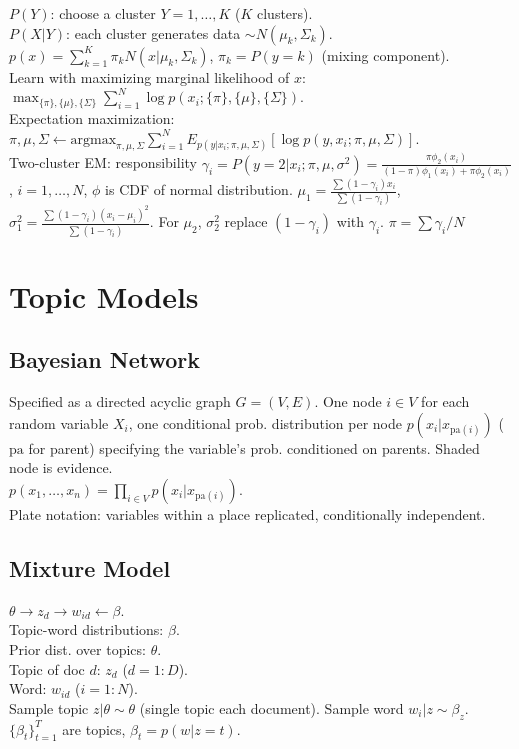 $P(Y)$: choose a cluster $Y=1, \dots, K$ ($K$ clusters).\\
$P(X|Y)$: each cluster generates data $\sim N(\mu_k, \Sigma_k)$.\\
$p(x) = \sum_{k=1}^K \pi_k N(x|\mu_k, \Sigma_k)$, $\pi_k=P(y=k)$ (mixing component).\\
Learn with maximizing marginal likelihood of $x$: $\max_{\{\pi\}, \{\mu\}, \{\Sigma\}}\sum_{i=1}^N\log p(x_i; \{\pi\},\{\mu\},\{\Sigma\})$.\\
Expectation maximization: $\pi, \mu, \Sigma \leftarrow \text{argmax}_{\pi, \mu, \Sigma}\sum_{i=1}^N E_{p(y|x_i;\pi,\mu,\Sigma)}[\log p(y,x_i;\pi,\mu,\Sigma)]$.\\
Two-cluster EM: responsibility $\gamma_i = P(y=2|x_i;\pi,\mu,\sigma^2) =  \frac{\pi\phi_2(x_i)}{(1-\pi)\phi_1(x_i)+\pi\phi_2(x_i)}$, $i=1, \dots, N$, $\phi$ is CDF of normal distribution. $\mu_1=\frac{\sum(1-\gamma_i)x_i}{\sum(1-\gamma_i)}$, $\sigma_1^2=\frac{\sum(1-\gamma_i)(x_i-\mu_i)^2}{\sum(1-\gamma_i)}$. For $\mu_2$, $\sigma_2^2$ replace $(1-\gamma_i)$ with $\gamma_i$. $\pi = \sum \gamma_i/N$

\section{Topic Models}

\subsection*{Bayesian Network}

Specified as a directed acyclic graph $G = (V, E)$. One node $i \in V$ for each random variable $X_i$, one conditional prob. distribution per node $p(x_i|x_{\text{pa}(i)})$ ($\text{pa}$ for parent) specifying the variable's prob. conditioned on parents. Shaded node is evidence.\\
$p(x_1, \dots, x_n) = \prod_{i\in V}p(x_i|x_{\text{pa}(i)})$.\\
Plate notation: variables within a place replicated, conditionally independent.

\subsection*{Mixture Model}

$\theta \rightarrow z_d \rightarrow w_{id} \leftarrow \beta$.\\
Topic-word distributions: $\beta$.\\
Prior dist. over topics: $\theta$.\\
Topic of doc $d$: $z_d$ ($d=1:D$).\\
Word: $w_{id}$ ($i = 1 : N$).\\
Sample topic $z|\theta \sim \theta$ (single topic each document). Sample word $w_i|z \sim \beta_z$. $\{\beta_t\}_{t=1}^T$ are topics, $\beta_t=p(w|z=t)$.

